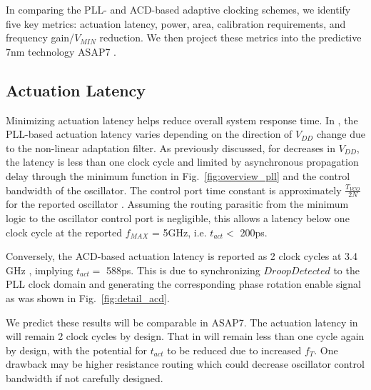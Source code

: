 \documentclass[twoside,9pt,journal,letterpage]{IEEEtran}
\begin{document}
In comparing the PLL- and ACD-based adaptive clocking schemes, we identify five key metrics: actuation latency, power, area, calibration requirements, and frequency gain/$V_{MIN}$ reduction. We then project these metrics into the predictive 7nm technology ASAP7 \cite{asap7}.

\vspace{-10pt}
\subsection{Actuation Latency}
\label{sec:ActuationLatency}
Minimizing actuation latency helps reduce overall system response time. In \cite{hashimoto2018}, the PLL-based actuation latency varies depending on the direction of $V_{DD}$ change due to the non-linear adaptation filter. As previously discussed, for decreases in $V_{DD}$, the latency is less than one clock cycle and limited by asynchronous propagation delay through the minimum function in Fig.\ \ref{fig:overview_pll} and the control bandwidth of the oscillator. The control port time constant is approximately $\frac{T_{VCO}}{2N}$ for the reported oscillator \cite{hashimoto2018}. Assuming the routing parasitic from the minimum logic to the oscillator control port is negligible, this allows a latency below one clock cycle at the reported $f_{MAX}$ = 5GHz, i.e. $t_{act} <$ 200ps.

Conversely, the ACD-based actuation latency is reported as 2 clock cycles at 3.4 GHz \cite{wilcox2015}, implying $t_{act} =$ 588ps. This is due to synchronizing $DroopDetected$ to the PLL clock domain  and generating the corresponding phase rotation enable signal as was shown in Fig.\ \ref{fig:detail_acd}.

We predict these results will be comparable in ASAP7. The actuation latency in \cite{wilcox2015} will remain 2 clock cycles by design. That in \cite{hashimoto2018} will remain less than one cycle again by design, with the potential for $t_{act}$ to be reduced due to increased $f_{T}$. One drawback may be higher resistance routing which could decrease oscillator control bandwidth if not carefully designed.

\end{document}
